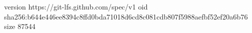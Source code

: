 version https://git-lfs.github.com/spec/v1
oid sha256:b644e446ee8394c8ffd0bda71018d6cd8c081cdb807f5988aefbf52ef20a6b76
size 87544
